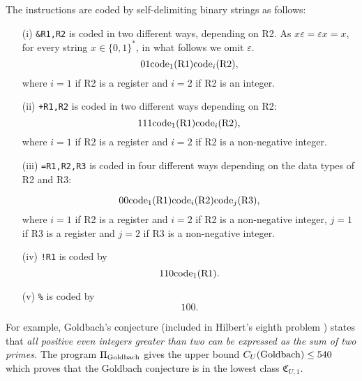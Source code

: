 \documentclass[
aip,
cha,
amssymb
]{revtex4-1}
\def \C{{\mathfrak C}}
\begin{document}
The instructions are coded by self-delimiting binary  strings as follows:
\begin{itemize}
\item[{\rm (i)}]  {\tt \&R1,R2} is coded in two different ways, depending on R2.
As $x\varepsilon = \varepsilon x=x$, for every string $x \in \{0,1\}^{*}$, in what follows we omit $\varepsilon$.
\[ 01{\rm code}_{1}({\rm R}1){\rm code}_{i}({\rm R}2),\]
where $i=1$  if R2 is a register and $i=2$ if R2 is an integer.

\item[{\rm (ii)}]   {\tt +R1,R2} is coded in two different ways depending on R2:
\[ 111{\rm code}_{1}({\rm R}1){\rm code}_{i}({\rm R}2),\]
where $i=1$  if R2 is a register and $i=2$ if R2 is  a non-negative integer.

\item[{\rm (iii)}]  {\tt =R1,R2,R3} is coded in four different ways depending on the data types of  R2 and R3:


\[ 00{\rm code}_{1}({\rm R}1){\rm code}_{i}({\rm R}2){\rm code}_{j}({\rm R}3),\]
where $i=1$  if R2 is a register and $i=2$ if R2 is a non-negative integer,
$j=1$  if R3 is a register and $j=2$ if R3 is a non-negative integer.


\item[{\rm (iv)}]  {\tt !R1} is coded by \[110{\rm code}_{1}({\rm R1}).\]
\item[{\rm (v)}]  {\tt \%} is coded by \[100.\]
\end{itemize}


For example, Goldbach's conjecture (included in Hilbert's eighth problem \cite{hilbert-1900e})
states   that {
\it all positive even integers greater than two can be expressed as the
sum of two primes.}
The program  $\Pi_{\rm Goldbach}$  gives the upper bound $C_{U}({\rm Goldbach})
\le 540$ which proves that  the Goldbach conjecture is in the lowest class $\C_{U,1}$.
\end{document}
